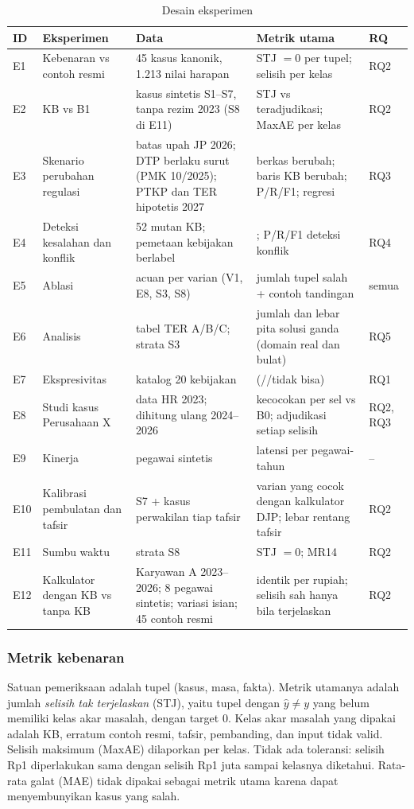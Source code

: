 \begin{table}[t]
\centering
\caption{Desain eksperimen}
\label{tab:eksperimen}
\footnotesize
\begin{tabularx}{\textwidth}{@{}l P{3.6cm} L L l@{}}
\toprule
\textbf{ID} & \textbf{Eksperimen} & \textbf{Data} & \textbf{Metrik utama} & \textbf{RQ} \\
\midrule
E1 & Kebenaran vs contoh resmi & 45 kasus kanonik, 1.213 nilai harapan & STJ $=0$ per tupel; selisih per kelas & RQ2 \\
E2 &  KB vs B1 & kasus sintetis S1--S7, tanpa  rezim 2023 (S8 di E11) & STJ vs  teradjudikasi; MaxAE per kelas & RQ2 \\
E3 & Skenario perubahan regulasi & batas upah JP 2026; DTP berlaku surut (PMK 10/2025); PTKP dan TER hipotetis 2027 & berkas  berubah; baris KB berubah;  P/R/F1; regresi & RQ3 \\
E4 & Deteksi kesalahan dan konflik & 52 mutan KB; pemetaan kebijakan berlabel & ; P/R/F1 deteksi konflik & RQ4 \\
E5 & Ablasi & acuan per varian (V1, E8, S3, S8) & jumlah tupel salah + contoh tandingan & semua \\
E6 & Analisis  & tabel TER A/B/C; strata S3 & jumlah dan lebar pita solusi ganda (domain real dan bulat) & RQ5 \\
E7 & Ekspresivitas & katalog 20 kebijakan &  (//tidak bisa) & RQ1 \\
E8 & Studi kasus Perusahaan X & data HR 2023; dihitung ulang 2024--2026 & kecocokan per sel vs B0; adjudikasi setiap selisih & RQ2, RQ3 \\
E9 & Kinerja & pegawai sintetis & latensi per pegawai-tahun & -- \\
E10 & Kalibrasi pembulatan dan tafsir & S7 + kasus perwakilan tiap tafsir & varian yang cocok dengan kalkulator DJP; lebar rentang tafsir & RQ2 \\
E11 & Sumbu waktu & strata S8 & STJ $=0$; MR14 & RQ2 \\
E12 & Kalkulator dengan KB vs tanpa KB & Karyawan A 2023--2026; 8 pegawai sintetis; variasi isian; 45 contoh resmi & identik per rupiah; selisih sah hanya bila terjelaskan & RQ2 \\
\bottomrule
\end{tabularx}
\end{table}

\subsubsection{Metrik kebenaran}
Satuan pemeriksaan adalah tupel (kasus, masa, fakta). Metrik utamanya adalah jumlah \emph{selisih tak terjelaskan} (STJ), yaitu tupel dengan $\hat{y} \neq y$ yang belum memiliki kelas akar masalah, dengan target 0. Kelas akar masalah yang dipakai adalah  KB, erratum contoh resmi, tafsir,  pembanding, dan input tidak valid. Selisih maksimum (MaxAE) dilaporkan per kelas. Tidak ada toleransi: selisih Rp1 diperlakukan sama dengan selisih Rp1 juta sampai kelasnya diketahui. Rata-rata galat (MAE) tidak dipakai sebagai metrik utama karena dapat menyembunyikan kasus yang salah.

